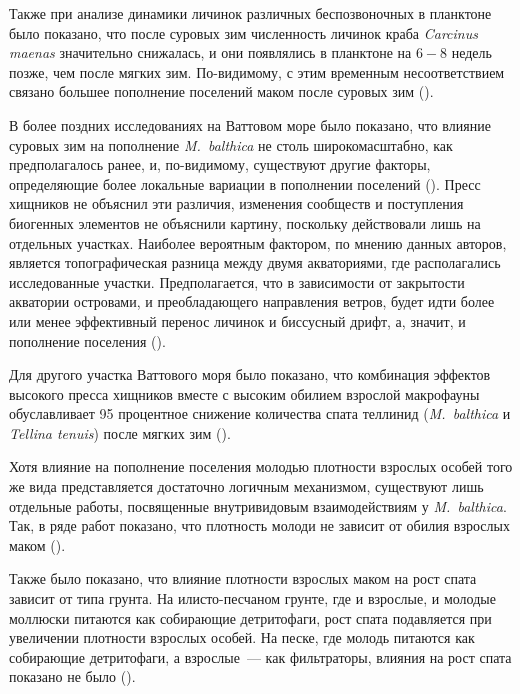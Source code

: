 Также при анализе динамики личинок различных беспозвоночных в планктоне было показано, что после суровых зим численность личинок краба \textit{Carcinus maenas} значительно снижалась, и они появлялись в планктоне на $6-8$ недель позже, чем после мягких зим. 
По-видимому, с этим временным несоответствием связано большее пополнение поселений маком после суровых зим (\cite{Strasser_Gunter_2001}).

В более поздних исследованиях на Ваттовом море было показано, что влияние суровых зим на пополнение \textit{M.~balthica} не столь широкомасштабно, как предполагалось ранее, и, по-видимому, существуют другие факторы, определяющие более локальные вариации в пополнении поселений (\cite{Strasser_et_al_2003, Flatch_2003}).
Пресс хищников не объяснил эти различия, изменения сообществ и поступления биогенных элементов не объяснили картину, поскольку действовали лишь на отдельных участках. 
Наиболее вероятным фактором, по мнению данных авторов, является топографическая разница между двумя акваториями, где располагались исследованные участки. 
Предполагается, что в зависимости от закрытости акватории островами, и преобладающего направления ветров, будет идти более или менее эффективный перенос личинок и биссусный дрифт, а, значит, и пополнение поселения (\cite{Strasser_et_al_2003}).

Для другого участка Ваттового моря было показано, что комбинация эффектов высокого пресса хищников вместе с высоким обилием взрослой макрофауны обуславливает 95 процентное снижение количества спата теллинид (\textit{M.~balthica} и \textit{Tellina tenuis}) после мягких зим (\cite{Flatch_2003}). 

Хотя влияние на пополнение поселения молодью плотности взрослых особей того же вида представляется достаточно логичным механизмом, существуют лишь отдельные работы, посвященные внутривидовым взаимодействиям у \textit{M.~balthica}. 
Так, в ряде работ показано, что плотность молоди не зависит от обилия взрослых маком (\cite{Olafsson_1989, Vincent_et_al_1989, Beukema_et_al_2001, Richards_et_al_2002}). 

 Также было показано, что влияние плотности взрослых маком на рост спата зависит от типа грунта. 
На илисто-песчаном грунте, где и взрослые, и молодые моллюски питаются как собирающие детритофаги, рост спата подавляется при увеличении плотности взрослых особей. 
На песке, где молодь питаются как собирающие детритофаги, а взрослые~--- как фильтраторы, влияния на рост спата показано не было (\cite{Olafsson_1989}).

